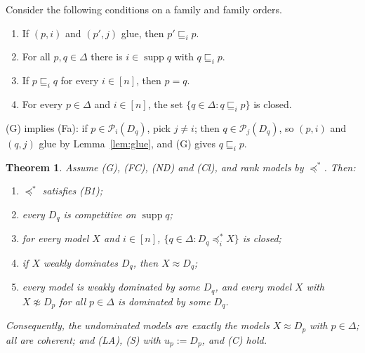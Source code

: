\documentclass[11pt]{article}
\newtheorem{theorem}{Theorem}[section]
\theoremstyle{definition}
\newcommand{\supp}{\operatorname{supp}}
\newcommand{\Pc}{\mathcal P}
\newcommand{\ws}{\preceq^{*}}
\begin{document}
Consider the following conditions on a family and family orders.
\begin{enumerate}[itemsep=2pt]
\item[\textbf{(G)}] If $(p,i)$ and $(p',j)$ glue, then $p'\sqsubseteq_ip$.
\item[\textbf{(FC)}] For all $p,q\in\Delta$ there is $i\in\supp q$ with $q\sqsubseteq_ip$.
\item[\textbf{(ND)}] If $p\sqsubseteq_iq$ for every $i\in[n]$, then $p=q$.
\item[\textbf{(Cl)}] For every $p\in\Delta$ and $i\in[n]$, the set $\{q\in\Delta:q\sqsubseteq_ip\}$ is closed.
\end{enumerate}
(G) implies (Fa): if $p\in\Pc_i(D_q)$, pick $j\ne i$; then $q\in\Pc_j(D_q)$, so $(p,i)$ and $(q,j)$ glue by Lemma~\ref{lem:glue}, and (G) gives $q\sqsubseteq_ip$.

\begin{theorem}\label{thm:general}
Assume (G), (FC), (ND) and (Cl), and rank models by $\ws$. Then:
\begin{enumerate}[label=(\alph*)]
\item $\ws$ satisfies (B1);
\item every $D_q$ is competitive on $\supp q$;
\item for every model $X$ and $i\in[n]$, $\{q\in\Delta:D_q\ws_iX\}$ is closed;
\item if $X$ weakly dominates $D_q$, then $X\approx D_q$;
\item every model is weakly dominated by some $D_q$, and every model $X$ with $X\not\approx D_p$ for all $p\in\Delta$ is dominated by some $D_q$.
\end{enumerate}
Consequently, the undominated models are exactly the models $X\approx D_p$ with $p\in\Delta$; all are coherent; and (LA), (S) with $u_p:=D_p$, and (C) hold.
\end{theorem}
\end{document}

